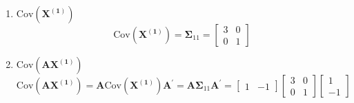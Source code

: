 \begin{enumerate}[label=(\alph*)]
\[\begin{bmatrix}
                        X_1 \\
                        X_2
                    \end{bmatrix}
                \right]
                =
                \begin{bmatrix}
                    1 & -1
                \end{bmatrix}
                E\left[
                    \begin{bmatrix}
                        X_1 \\
                        X_2
                    \end{bmatrix}
                \right]
                =
                \begin{bmatrix}
                    1 & -1
                \end{bmatrix}
                \begin{bmatrix}
                    4 \\
                    3
                \end{bmatrix}
                =
                4 - 3 = 1
            \]
            \item $\text{Cov}\left(\mathbf{X^{(1)}}\right)$
            \[
                \text{Cov}\left(\mathbf{X^{(1)}}\right)
                =
                \mathbf{\Sigma}_{11}
                =
                \begin{bmatrix}
                    3 & 0 \\
                    0 & 1
                \end{bmatrix}
            \]
            \item $\text{Cov}\left(\mathbf{A}\mathbf{X^{(1)}}\right)$
            \[
                \text{Cov}\left(\mathbf{A}\mathbf{X^{(1)}}\right)
                =
                \mathbf{A}\text{Cov}\left(\mathbf{X^{(1)}}\right)\mathbf{A}^\prime
                =
                \mathbf{A}\mathbf{\Sigma}_{11}\mathbf{A}^\prime
                =
                \begin{bmatrix}
                    1 & -1
                \end{bmatrix}
                \begin{bmatrix}
                    3 & 0 \\
                    0 & 1
                \end{bmatrix}
                \begin{bmatrix}
                    1 \\
                    -1

\end{bmatrix}\]
\end{enumerate}
